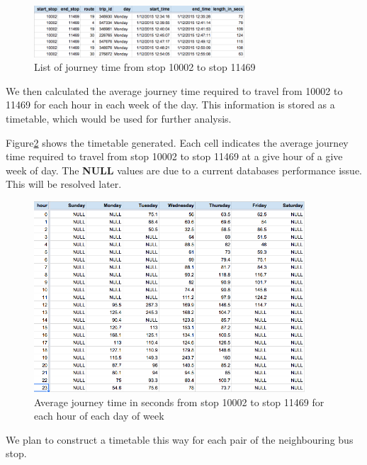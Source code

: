 \begin{figure}
\centering
\includegraphics[width=0.7\textwidth]{figures/journey_time_10002.png}
\caption{\label{fig:journey_time_10002} List of journey time from stop 10002 to stop 11469}
\end{figure}


\par We then calculated the average journey time required to travel from 10002 to 11469 for each hour in each week of the day. This information is stored as a timetable, which would be used for further analysis. 

Figure\ref{fig:timetable_10002} shows the timetable generated. Each cell indicates the average journey time required to travel from stop 10002 to stop 11469 at a give hour of a give week of day. The \textbf{NULL} values are due to a current databases performance issue. This will be resolved later.

\begin{figure}
\centering
\includegraphics[width=0.9\textwidth]{figures/timetable_10002.png}
\caption{\label{fig:timetable_10002} Average journey time in seconds from stop 10002 to stop 11469 for each hour of each day of week}
\end{figure}

\par We plan to construct a timetable this way for each pair of the neighbouring bus stop.

